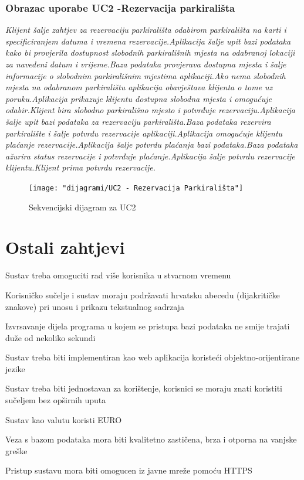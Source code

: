 \subsubsection{Obrazac uporabe UC2 -Rezervacija parkirališta}

\textit{Klijent šalje zahtjev za rezervaciju parkirališta odabirom parkirališta na karti i specificiranjem datuma i vremena rezervacije.Aplikacija šalje upit bazi podataka kako bi provjerila dostupnost slobodnih parkirališnih mjesta na odabranoj lokaciji za navedeni datum i vrijeme.Baza podataka provjerava dostupna mjesta i šalje informacije o slobodnim parkirališnim mjestima aplikaciji.Ako nema slobodnih mjesta na odabranom parkiralištu aplikacija obavještava klijenta o tome uz poruku.Aplikacija prikazuje klijentu dostupna slobodna mjesta i omogućuje odabir.Klijent bira slobodno parkirališno mjesto i potvrđuje rezervaciju.Aplikacija šalje upit bazi podataka za rezervaciju parkirališta.Baza podataka rezervira parkiralište i šalje potvrdu rezervacije aplikaciji.Aplikacija omogućuje klijentu plaćanje rezervacije.Aplikacija šalje potvrdu plaćanja bazi podataka.Baza podataka ažurira status rezervacije i potvrđuje plaćanje.Aplikacija šalje potvrdu rezervacije klijentu.Klijent prima potvrdu rezervacije.}


\begin{figure}
	\centering
	\texttt{[image: "dijagrami/UC2 - Rezervacija Parkirališta"]}
	\caption{Sekvencijski dijagram za UC2}
	\label{fig:uc2---rezervacija-parkiralista}
\end{figure}

\newpage

\section{Ostali zahtjevi}
	\begin{packed_item}
		\item {Sustav treba omoguciti rad više korisnika u stvarnom vremenu}
		\item {Korisničko sučelje i sustav moraju podržavati hrvatsku abecedu (dijakritičke znakove) pri unosu i prikazu tekstualnog sadrzaja}
		\item {Izvrsavanje dijela programa u kojem se pristupa bazi podataka ne smije trajati duže od nekoliko sekundi}
		\item {Sustav treba biti implementiran kao web aplikacija koristeći objektno-orijentirane jezike}
		\item {Sustav treba biti jednostavan za korištenje, korisnici se moraju znati koristiti sučeljem bez opširnih uputa }
		\item {Sustav kao valutu koristi EURO}
		\item {Veza s bazom podataka mora biti kvalitetno zastičena, brza i otporna na vanjske greške}
		\item {Pristup sustavu mora biti omogucen iz javne mreže pomoću HTTPS}
	\end{packed_item}



\eject

	
